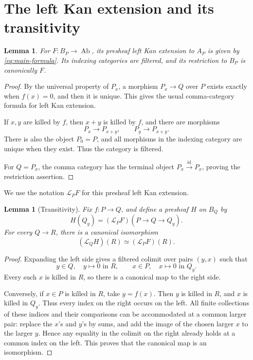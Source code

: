 \documentclass[11pt]{article}
\newtheorem{lemma}[theorem]{Lemma}
\theoremstyle{definition}
\theoremstyle{remark}
\DeclareMathOperator{\Ab}{Ab}
\newcommand{\LL}{\mathcal L}
\begin{document}
\section{The left Kan extension and its transitivity}

\begin{lemma}\label{lem:kan}
For \(F:B_P\to\Ab\), its presheaf left Kan extension to \(A_P\) is
given by \eqref{eq:main-formula}. Its indexing categories are
filtered, and its restriction to \(B_P\) is canonically \(F\).
\end{lemma}

\begin{proof}
By the universal property of \(P_x\), a morphism \(P_x\to Q\) over
\(P\) exists exactly when \(f(x)=0\), and then it is unique.
This gives the usual comma-category formula for left Kan
extension.


If \(x,y\) are killed by \(f\), then \(x+y\) is killed by \(f\), and
there are morphisms
\[
P_x\longrightarrow P_{x+y},
\qquad
P_y\longrightarrow P_{x+y}.
\]
There is also the object \(P_0=P\), and all morphisms in the
indexing category are unique when they exist. Thus the category
is filtered.

For \(Q=P_x\), the comma category has the terminal object
\(P_x\xrightarrow{\mathrm{id}}P_x\), proving the restriction
assertion.
\end{proof}

We use the notation \(\LL_PF\) for this presheaf left Kan extension.

\begin{lemma}[Transitivity]\label{lem:transitivity}
Fix \(f:P\to Q\), and define a presheaf \(H\) on \(B_Q\) by
\[
H(Q_y)=(\LL_PF)(P\to Q\to Q_y).
\]
For every \(Q\to R\), there is a canonical isomorphism
\[
(\LL_QH)(R)\simeq(\LL_PF)(R).
\]
\end{lemma}

\begin{proof}
Expanding the left side gives a filtered colimit over pairs
\((y,x)\) such that
\[
y\in Q,\quad y\mapsto0\text{ in }R,
\qquad
x\in P,\quad x\mapsto0\text{ in }Q_y.
\]
Every such \(x\) is killed in \(R\), so there is a canonical map to
the right side.

Conversely, if \(x\in P\) is killed in \(R\), take \(y=f(x)\).
Then \(y\) is killed in \(R\), and \(x\) is killed in \(Q_y\).
Thus every index on the right occurs on the left.
All finite collections of these indices and their comparisons can
be accommodated at a common larger pair: replace the \(x\)'s and
\(y\)'s by sums, and add the image of the chosen larger \(x\) to
the larger \(y\). Hence any equality in the colimit on the right
already holds at a common index on the left. This proves that the
canonical map is an isomorphism.
\end{proof}
\end{document}

